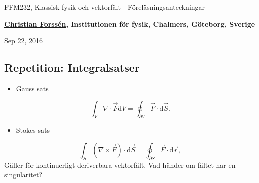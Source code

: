 \documentclass[%
oneside,                 %
final,                   %
10pt]{article}
\begin{document}






\thispagestyle{empty}

\begin{center}
{\LARGE\bf
\begin{spacing}{1.25}
FFM232, Klassisk fysik och vektorfält - Föreläsningsanteckningar
\end{spacing}
}
\end{center}


\begin{center}
{\bf \href{{http://fy.chalmers.se/subatom/tsp/}}{Christian Forssén}, Institutionen för fysik, Chalmers, Göteborg, Sverige${}^{}$} \\ [0mm]
\end{center}

\begin{center}
\end{center}
    

\begin{center}
Sep 22, 2016
\end{center}

\vspace{1cm}


\subsection{Repetition: Integralsatser}

\begin{itemize}
\item Gauss sats
\end{itemize}

\noindent
\begin{equation}
  \int_V \nabla \cdot \vec{F} \mbox{d}V = \oint_{\partial V} \vec{F} \cdot \mbox{d} \vec{S}.
\end{equation}
\begin{itemize}
\item Stokes sats
\end{itemize}

\noindent
\begin{equation}
  \int_S \left( \nabla \times \vec{F}\right) \cdot \mbox{d}\vec{S} = \oint_{\partial S} \vec{F}\cdot
\mbox{d}\vec{r},
\end{equation}
Gäller för kontinuerligt deriverbara vektorfält. Vad händer om fältet har en singularitet?
\end{document}
